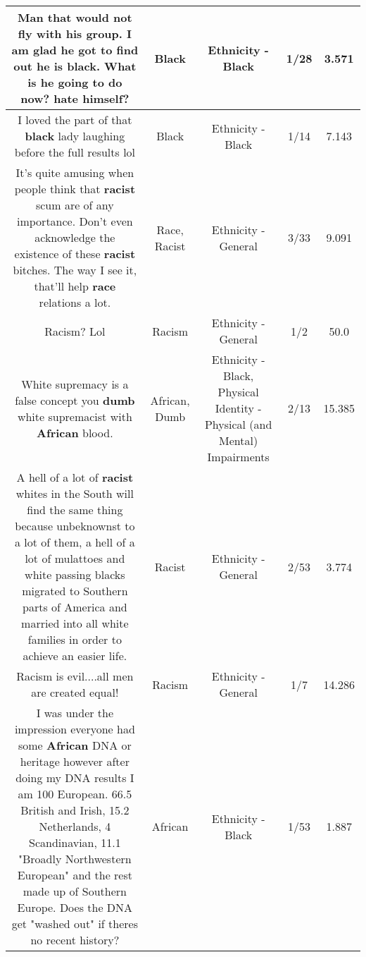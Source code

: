 \documentclass[11pt]{article}
\newlength\mylength
\begin{document}
\begin{center}
\begin{longtable}{|C{.65\mylength}|C{.30\mylength}|C{.12\mylength}|C{.12\mylength}|C{.12\mylength}|}
  \small Man that would not fly with his group. I am glad he got to find out he is \textbf{black}. What is he going to do now? hate himself?\normalsize   & Black & Ethnicity - Black & 1/28 & 3.571 \\  \hline
  \small I loved the part of that \textbf{black} lady laughing before the full results lol\normalsize   & Black & Ethnicity - Black & 1/14 & 7.143 \\  \hline
  \small It's quite amusing when people think that \textbf{racist} scum are of any importance. Don't even acknowledge the existence of these \textbf{racist} bitches. The way I see it, that'll help \textbf{race} relations a lot.\normalsize   & Race, Racist & Ethnicity - General & 3/33 & 9.091 \\  \hline
  \small Racism? Lol\normalsize   & Racism & Ethnicity - General & 1/2 & 50.0 \\  \hline
  \small White supremacy is a false concept you \textbf{dumb} white supremacist with \textbf{African} blood.\normalsize   & African, Dumb & Ethnicity - Black, Physical Identity - Physical (and Mental) Impairments & 2/13 & 15.385 \\  \hline
  \small A hell of a lot of \textbf{racist} whites in the South will find the same thing because unbeknownst to a lot of them, a hell of a lot of mulattoes and white passing blacks migrated to Southern parts of America and married into all white families in order to achieve an easier life.\normalsize   & Racist & Ethnicity - General & 2/53 & 3.774 \\  \hline
  \small Racism is evil....all men are created equal!\normalsize   & Racism & Ethnicity - General & 1/7 & 14.286 \\  \hline
  \small I was under the impression everyone had some \textbf{African} DNA or heritage however after doing my DNA results I am 100 European. 66.5 British and Irish, 15.2 Netherlands, 4 Scandinavian, 11.1 "Broadly Northwestern European"  and the rest made up of Southern Europe. Does the DNA get "washed out" if theres no recent history?\normalsize   & African & Ethnicity - Black & 1/53 & 1.887 \\  \hline

\end{longtable}
\end{center}
\end{document}
